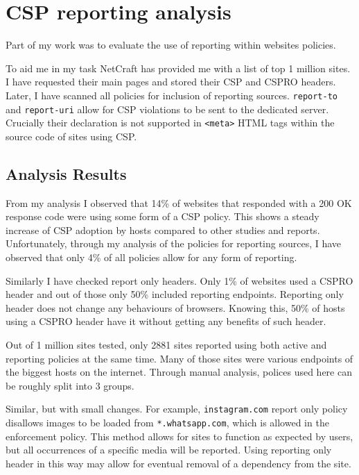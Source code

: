 \section{CSP reporting analysis}

Part of my work was to evaluate the use of reporting within websites policies.

To aid me in my task NetCraft has provided me with a list of top 1 million sites.
I have requested their main pages and stored their CSP and CSPRO headers.
Later, I have scanned all policies for inclusion of reporting sources.
\texttt{report-to} and \texttt{report-uri} allow for CSP violations to be sent to the dedicated server.
Crucially their declaration is not supported in \texttt{<meta>} HTML tags within the source code of sites using CSP.

\subsection{Analysis Results}

From my analysis I observed that 14\% of websites that responded with a 200 OK response code were using some form of a CSP policy.
This shows a steady increase of CSP adoption by hosts compared to other studies and reports.
Unfortunately, through my analysis of the policies for reporting sources, I have observed that only 4\% of all policies allow for any form of reporting.

Similarly I have checked report only headers. 
Only 1\% of websites used a CSPRO header and out of those only 50\% included reporting endpoints.
Reporting only header does not change any behaviours of browsers. 
Knowing this, 50\% of hosts using a CSPRO header have it without getting any benefits of such header.

Out of 1 million sites tested, only 2881 sites reported using both active and reporting policies at the same time.
Many of those sites were various endpoints of the biggest hosts on the internet.
Through manual analysis, polices used here can be roughly split into 3 groups.

Similar, but with small changes.
For example, \texttt{instagram.com} report only policy disallows images to be loaded from \texttt{*.whatsapp.com}, which is allowed in the enforcement policy.
This method allows for sites to function as expected by users, but all occurrences of a specific media will be reported.
Using reporting only header in this way may allow for eventual removal of a dependency from the site.

